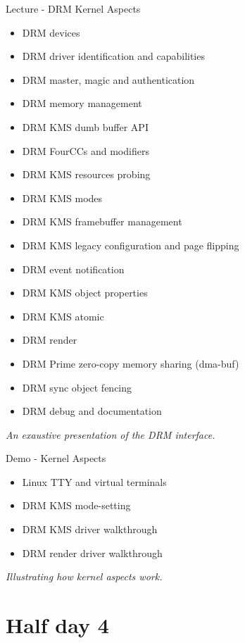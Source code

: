 \documentclass[a4paper,12pt,obeyspaces,spaces,hyphens]{article}
\begin{document}
\feagendatwocolumn
{Lecture - DRM Kernel Aspects}
{
  \begin{itemize}
  \item DRM devices
  \item DRM driver identification and capabilities
  \item DRM master, magic and authentication
  \item DRM memory management
  \item DRM KMS dumb buffer API
  \item DRM FourCCs and modifiers
  \item DRM KMS resources probing
  \item DRM KMS modes
  \item DRM KMS framebuffer management
  \item DRM KMS legacy configuration and page flipping
  \item DRM event notification
  \item DRM KMS object properties
  \item DRM KMS atomic
  \item DRM render
  \item DRM Prime zero-copy memory sharing (dma-buf)
  \item DRM sync object fencing
  \item DRM debug and documentation
  \end{itemize}
  \vspace{0.5em}
  {\em An exaustive presentation of the DRM interface.}
}
{Demo - Kernel Aspects}
{
  \begin{itemize}
  \item Linux TTY and virtual terminals
  \item DRM KMS mode-setting
  \item DRM KMS driver walkthrough
  \item DRM render driver walkthrough
  \end{itemize}
  \vspace{0.5em}
  {\em Illustrating how kernel aspects work.}
}

\section{Half day 4}
\end{document}
